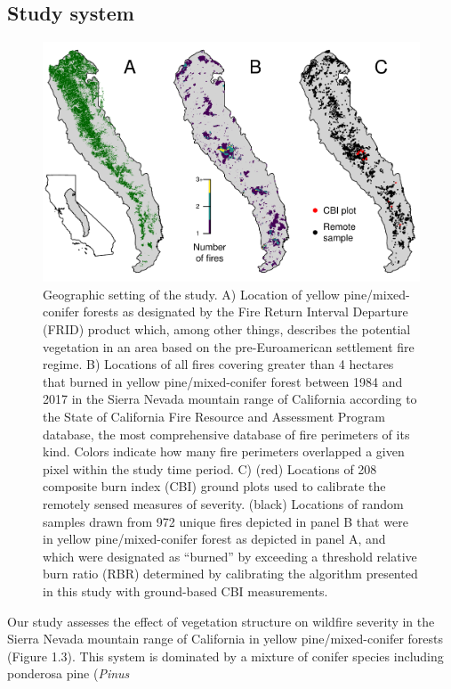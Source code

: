 \documentclass[twoside,12pt,final]{ucthesis-CA2012}
\begin{document}
\begin{ucmainmatter}
\subsection{Study system}\label{study-system}
\begin{figure}
\centering
\includegraphics[width=6.00000in]{figure/chap01/study-geographic-setting.pdf}
\caption{Geographic setting of the study. A) Location of yellow
pine/mixed-conifer forests as designated by the Fire Return Interval
Departure (FRID) product which, among other things, describes the
potential vegetation in an area based on the pre-Euroamerican settlement
fire regime. B) Locations of all fires covering greater than 4 hectares
that burned in yellow pine/mixed-conifer forest between 1984 and 2017 in
the Sierra Nevada mountain range of California according to the State of
California Fire Resource and Assessment Program database, the most
comprehensive database of fire perimeters of its kind. Colors indicate
how many fire perimeters overlapped a given pixel within the study time
period. C) (red) Locations of 208 composite burn index (CBI) ground
plots used to calibrate the remotely sensed measures of severity.
(black) Locations of random samples drawn from 972 unique fires depicted
in panel B that were in yellow pine/mixed-conifer forest as depicted in
panel A, and which were designated as ``burned'' by exceeding a
threshold relative burn ratio (RBR) determined by calibrating the
algorithm presented in this study with ground-based CBI measurements.}
\end{figure}
Our study assesses the effect of vegetation structure on wildfire
severity in the Sierra Nevada mountain range of California in yellow
pine/mixed-conifer forests (Figure 1.3). This system is dominated by a
mixture of conifer species including ponderosa pine (\emph{Pinus
}
\end{ucmainmatter}
\end{document}
